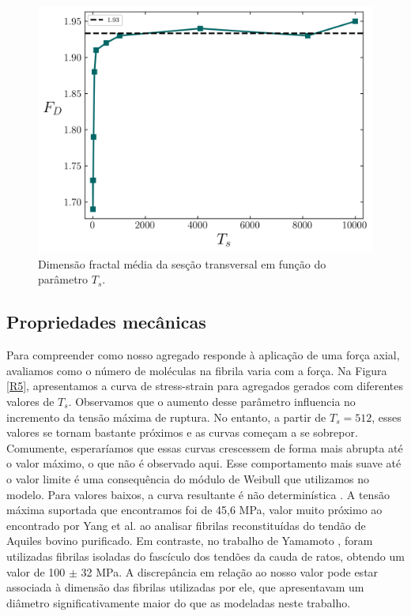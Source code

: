 \documentclass{article}
\begin{document}
    \begin{figure}[H]
        \centering
        \includegraphics[width=\textwidth]{figures/dim_frac.png}

        \caption{ Dimensão fractal média da sesção transversal em função do parâmetro \(T_{s}\).} 

        \label{R4}
    \end{figure}


    \subsection{Propriedades mecânicas}

    \indent Para compreender como nosso agregado responde à aplicação de uma força axial, avaliamos como o número de 
    moléculas na fibrila varia com a força. Na Figura \ref{R5}, apresentamos a curva de stress-strain para agregados 
    gerados com diferentes valores de \(T_{s}\). Observamos que o aumento desse parâmetro influencia no incremento da 
    tensão máxima de ruptura. No entanto, a partir de \(T_{s} = 512\), esses valores se tornam bastante próximos e as 
    curvas começam a se sobrepor. Comumente, esperaríamos que essas curvas crescessem de forma mais abrupta até o valor
    máximo, o que não é observado aqui. Esse comportamento mais suave até o valor limite é uma consequência do módulo 
    de Weibull que utilizamos no modelo. Para valores baixos, a curva resultante é não determinística 
    \cite{Parkinson1997}. A tensão máxima suportada que encontramos foi de 45,6 MPa, valor muito próximo ao encontrado 
    por Yang et al. \cite{YANG2012148} ao analisar fibrilas reconstituídas do tendão de Aquiles bovino purificado. 
    Em contraste, no trabalho de Yamamoto \cite{Noritaka}, foram utilizadas fibrilas isoladas do fascículo dos tendões 
    da cauda de ratos, obtendo um valor de 100 \(\pm\) 32 MPa. A discrepância em relação ao nosso valor pode estar 
    associada à dimensão das fibrilas utilizadas por ele, que apresentavam um diâmetro significativamente maior do que 
    as modeladas neste trabalho.
\end{document}
